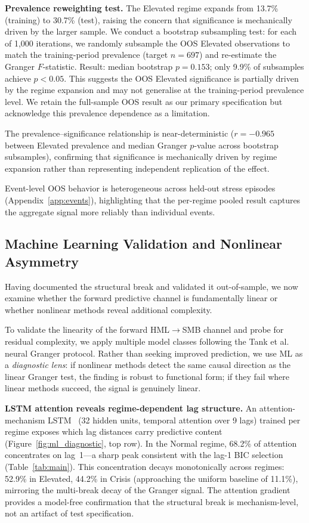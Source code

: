 \documentclass[sigconf,anonymous]{acmart}
\begin{document}
\textbf{Prevalence reweighting test.}
The Elevated regime expands from 13.7\% (training) to 30.7\% (test),
raising the concern that significance is mechanically driven by the larger sample.
We conduct a bootstrap subsampling test: for each of 1{,}000 iterations, we randomly
subsample the OOS Elevated observations to match the training-period prevalence
(target $n = 697$) and re-estimate the Granger $F$-statistic.
Result: median bootstrap $p = 0.153$; only 9.9\% of subsamples achieve $p < 0.05$.
This suggests the OOS Elevated significance is partially driven by the regime expansion
and may not generalise at the training-period prevalence level.
We retain the full-sample OOS result as our primary specification but acknowledge
this prevalence dependence as a limitation.

The prevalence--significance relationship is near-deterministic ($r = -0.965$
between Elevated prevalence and median Granger $p$-value across bootstrap
subsamples), confirming that significance is mechanically driven by regime
expansion rather than representing independent replication of the effect.

Event-level OOS behavior is heterogeneous across held-out stress episodes
(Appendix~\ref{app:events}), highlighting that the per-regime pooled result
captures the aggregate signal more reliably than individual events.

\subsection{Machine Learning Validation and Nonlinear Asymmetry}
\label{sec:ml_validation}

Having documented the structural break and validated it out-of-sample, we now examine whether the forward predictive channel is fundamentally linear or whether nonlinear methods reveal additional complexity.

To validate the linearity of the forward HML$\to$SMB channel and probe for
residual complexity, we apply multiple model classes following the
Tank et al.~\cite{tank2022neural} neural Granger protocol.
Rather than seeking improved prediction, we use ML as a \emph{diagnostic
lens}: if nonlinear methods detect the same causal direction as the
linear Granger test, the finding is robust to functional form;
if they fail where linear methods succeed, the signal is genuinely linear.

\textbf{LSTM attention reveals regime-dependent lag structure.}
An attention-mechanism LSTM~\cite{tank2022neural} (32 hidden units,
temporal attention over 9 lags) trained per regime exposes which lag
distances carry predictive content (Figure~\ref{fig:ml_diagnostic},
top row). In the Normal regime, 68.2\% of attention concentrates on
lag~1---a sharp peak consistent with the lag-1 BIC selection
(Table~\ref{tab:main}). This concentration decays monotonically across
regimes: 52.9\% in Elevated, 44.2\% in Crisis (approaching the uniform
baseline of 11.1\%), mirroring the multi-break decay of the Granger
signal. The attention gradient provides a model-free confirmation that
the structural break is mechanism-level, not an artifact of test specification.
\end{document}
